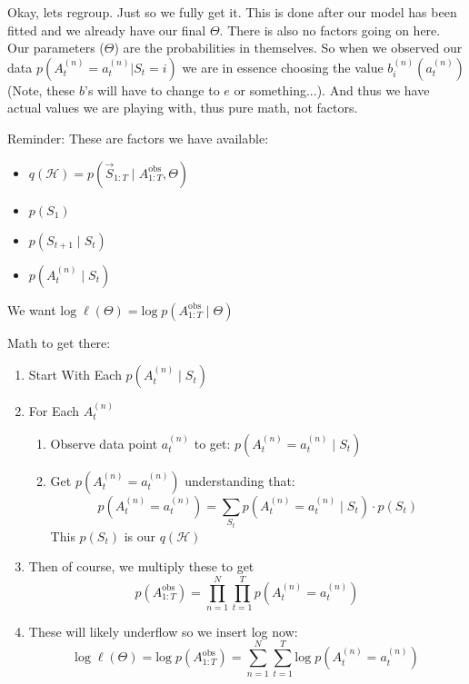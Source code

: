 Okay, lets regroup. Just so we fully get it. This is done after our model has been fitted and we already have our final $\Theta$. There is also no factors going on here. Our parameters ($\Theta$) are the probabilities in themselves. So when we observed our data $p(A_t^{(n)} = a_t^{(n)} | S_t = i)$ we are in essence choosing the value $b^{(n)}_i(a_t^{(n)})$ (Note, these $b$'s will have to change to $e$ or something...). And thus we have actual values we are playing with, thus pure math, not factors.











Reminder: These are factors we have available:
\begin{itemize}
\item $q(\mathcal{H}) = p(\vec{S}_{1:T} \mid A_{1:T}^{\text{obs}}, \Theta)$
\item $p(S_1)$
\item $p(S_{t+1} \mid S_t)$
\item $p(A^{(n)}_t \mid S_t)$
\end{itemize}

We want $\text{log} \; \ell(\Theta) = \text{log} \; p(A_{1:T}^{\text{obs}} \mid \Theta)$

Math to get there:
\begin{enumerate}
    \item Start With Each $p(A_t^{(n)} \mid S_t)$
    \item For Each $A_t^{(n)}$
        \begin{enumerate}
            \item Observe data point $a_t^{(n)}$ to get: $p(A_t^{(n)} = a^{(n)}_t \mid S_t)$
            \item Get $p(A_t^{(n)} = a^{(n)}_t)$ understanding that: 
                \[
p(A_t^{(n)} = a^{(n)}_t) = \sum\limits_{S_t} p(A_t^{(n)} = a^{(n)}_t \mid S_t) \cdot p(S_t)
                \]
                This $p(S_t)$ is our $q(\mathcal{H})$
        \end{enumerate}
    \item Then of course, we multiply these to get 
        \[
p(A_{1:T}^\text{obs}) = \prod\limits_{n=1}^N\prod\limits_{t=1}^T p(A_t^{(n)} = a^{(n)}_t)
        \]
    \item These will likely underflow so we insert log now: 
        \[
            \text{log} \; \ell(\Theta) = \text{log} \; p(A_{1:T}^\text{obs}) = \sum\limits_{n=1}^N\sum\limits_{t=1}^T \text{log} \; p(A_t^{(n)} = a^{(n)}_t)
        \]
\end{enumerate}

